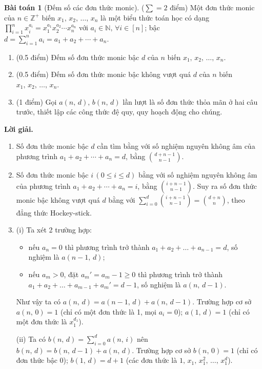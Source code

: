 \documentclass[a4paper, 11pt]{article}
\theoremstyle{definition}
\newtheorem{baitoan}{Bài toán}
\begin{document}
	
	\begin{tcolorbox}[breakable]
    	\begin{baitoan}[Đếm số các đơn thức monic] 
			($\sum = 2$ điểm)
			Một đơn thức monic của $n \in \mathbb{Z^+}$ biến $x_1,\,x_2,\,\ldots,\,x_n$ là một biểu thức toán học có dạng $\displaystyle \prod_{i=1}^n x_i^{a_i} = x_1^{a_1}x_2^{a_2}\cdots x_n^{a_n}$ với $a_i \in \mathbb{N},\,\forall i\in [n]$; bậc $d = \displaystyle\sum\limits_{i=1}^n a_i = a_1 + a_2 + \cdots + a_n$.
			\begin{enumerate}[label=(\alph*)]
				\item (0.5 điểm) Đếm số đơn thức monic bậc $d$ của $n$ biến $x_1,\,x_2,\,\ldots,\,x_n$.
				\item (0.5 điểm) Đếm số đơn thức monic bậc không vượt quá $d$ của $n$ biến $x_1,\,x_2,\,\ldots,\,x_n$.
				\item (1 điểm) Gọi $a(n,\,d),\,b(n,\,d)$ lần lượt là số đơn thức thỏa mãn ở hai câu trước, thiết lập các công thức đệ quy, quy hoạch động cho chúng.
			\end{enumerate}
		\end{baitoan}
	\end{tcolorbox}

	\textbf{Lời giải. }
	\begin{enumerate}[label=(\alph*)]
		\item Số đơn thức monic bậc $d$ cần tìm bằng với số nghiệm nguyên không âm của phương trình $a_1 + a_2 + \cdots + a_n = d$, bằng $\displaystyle {d+n-1 \choose n-1}$.
		\item Số đơn thức monic bậc $i\,(0 \leq i \leq d)$ bằng với số nghiệm nguyên không âm của phương trình $a_1 + a_2 + \cdots + a_n = i$, bằng $\displaystyle {i+n-1 \choose n-1}$. Suy ra số đơn thức monic bậc không vượt quá $d$ bằng với $\displaystyle\sum\limits_{i=0}^d {i+n-1 \choose n-1} = {d+n \choose n}$, theo đẳng thức Hockey-stick.
		\item (i) Ta xét 2 trường hợp: \begin{itemize}
			\item nếu $a_n = 0$ thì phương trình trở thành $a_1 + a_2 + \ldots + a_{n-1} = d$, số nghiệm là $a(n-1,\,d)$;
			\item nếu $a_m > 0$, đặt $a_m' = a_m - 1 \ge 0$ thì phương trình trở thành $a_1 + a_2 + \ldots + a_{m-1} + a_m' = d-1$, số nghiệm là $a(n,\,d-1)$.
		\end{itemize}
		Như vậy ta có $a(n,\,d) = a(n-1,\,d) + a(n,\,d-1)$. Trường hợp cơ sở $a(n,\,0) = 1$ (chỉ có một đơn thức là 1, mọi $a_i = 0$); $a(1,\,d) = 1$ (chỉ có một đơn thức là $x_1^{d_1}$).

		(ii) Ta có $\displaystyle b(n,\,d) = \sum\limits_{i=0}^d a(n,\,i)$ nên $b(n,\,d) = b(n,\,d-1) + a(n,\,d)$. Trường hợp cơ sở $b(n,\,0)=1$ (chỉ có đơn thức bậc 0); $b(1,\,d) = d+1$ (các đơn thức là $1,\,x_1,\,x_1^2,\,\ldots,\,x_1^d$).
	\end{enumerate}
\end{document}
